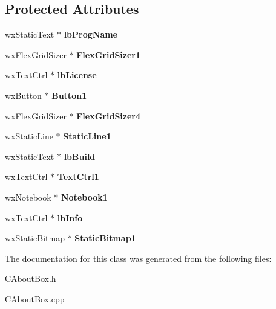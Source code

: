 \subsection*{Protected Attributes}
\begin{DoxyCompactItemize}
\item 
\mbox{\label{classCAboutBox_a0250ce66d89cd0c47107d23d7823b550}} 
wx\+Static\+Text $\ast$ {\bfseries lb\+Prog\+Name}
\item 
\mbox{\label{classCAboutBox_a7eb4127fb53f0df92c73ced7c9d8704b}} 
wx\+Flex\+Grid\+Sizer $\ast$ {\bfseries Flex\+Grid\+Sizer1}
\item 
\mbox{\label{classCAboutBox_af39fc1e955543ca8e4dc60d900e29339}} 
wx\+Text\+Ctrl $\ast$ {\bfseries lb\+License}
\item 
\mbox{\label{classCAboutBox_a6ee2c45e8140523726ae0adac39e5e8d}} 
wx\+Button $\ast$ {\bfseries Button1}
\item 
\mbox{\label{classCAboutBox_a03cbdcae864388315c72bc1b301cc079}} 
wx\+Flex\+Grid\+Sizer $\ast$ {\bfseries Flex\+Grid\+Sizer4}
\item 
\mbox{\label{classCAboutBox_a3839eefb2b7f455608fd9e84893fd404}} 
wx\+Static\+Line $\ast$ {\bfseries Static\+Line1}
\item 
\mbox{\label{classCAboutBox_ac2602c693f6375acace0ffc56f3a62c5}} 
wx\+Static\+Text $\ast$ {\bfseries lb\+Build}
\item 
\mbox{\label{classCAboutBox_a1b4ced1fdb78e6579f120a14aa1db7ec}} 
wx\+Text\+Ctrl $\ast$ {\bfseries Text\+Ctrl1}
\item 
\mbox{\label{classCAboutBox_a34c7e54c89dca93bdc268582e9b135c4}} 
wx\+Notebook $\ast$ {\bfseries Notebook1}
\item 
\mbox{\label{classCAboutBox_ab8d715f8ada37310f3d43b81b739f979}} 
wx\+Text\+Ctrl $\ast$ {\bfseries lb\+Info}
\item 
\mbox{\label{classCAboutBox_ad691d2c2a7dd5252942841d72883ccdd}} 
wx\+Static\+Bitmap $\ast$ {\bfseries Static\+Bitmap1}
\end{DoxyCompactItemize}


The documentation for this class was generated from the following files\+:\begin{DoxyCompactItemize}
\item 
C\+About\+Box.\+h\item 
C\+About\+Box.\+cpp\end{DoxyCompactItemize}
